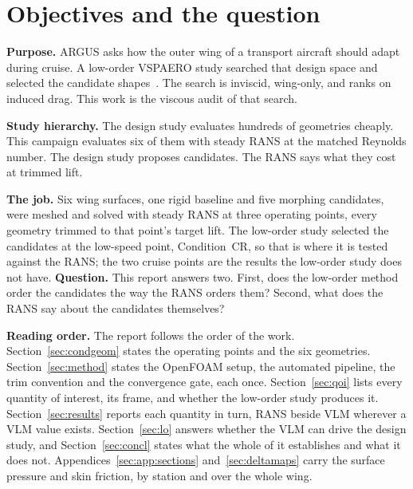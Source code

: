 \section{Objectives and the question}
\label{sec:intro}
\label{sec:objectives}
\textbf{Purpose.} ARGUS asks how the outer wing of a transport aircraft should adapt during
cruise. A low-order VSPAERO study searched that design space and selected the candidate
shapes~\cite{zheng}. The search is inviscid, wing-only, and ranks on induced drag. This work is
the viscous audit of that search.

\textbf{Study hierarchy.} The design study evaluates hundreds of geometries cheaply. This
campaign evaluates six of them with steady RANS at the matched Reynolds number. The design study
proposes candidates. The RANS says what they cost at trimmed lift.

\textbf{The job.} Six wing surfaces, one rigid baseline and five morphing candidates, were meshed and
solved with steady RANS at three operating points, every geometry trimmed to that point's target
lift. The low-order study selected the candidates at the low-speed point, Condition~CR, so that is
where it is tested against the RANS; the two cruise points are the results the low-order study
does not have.
\textbf{Question.} This report answers two. First, does the low-order method order the candidates
the way the RANS orders them? Second, what does the RANS say about the candidates themselves?

\textbf{Reading order.} The report follows the order of the work. Section~\ref{sec:condgeom} states
the operating points and the six geometries. Section~\ref{sec:method} states the OpenFOAM setup,
the automated pipeline, the trim convention and the convergence gate, each once.
Section~\ref{sec:qoi} lists every quantity of interest, its frame, and whether the low-order study
produces it. Section~\ref{sec:results} reports each quantity in turn, RANS beside VLM wherever a
VLM value exists. Section~\ref{sec:lo} answers whether the VLM can drive the design study, and
Section~\ref{sec:concl} states what the whole of it establishes and what it does not.
Appendices~\ref{sec:app:sections} and~\ref{sec:deltamaps} carry the surface pressure and skin
friction, by station and over the whole wing.

